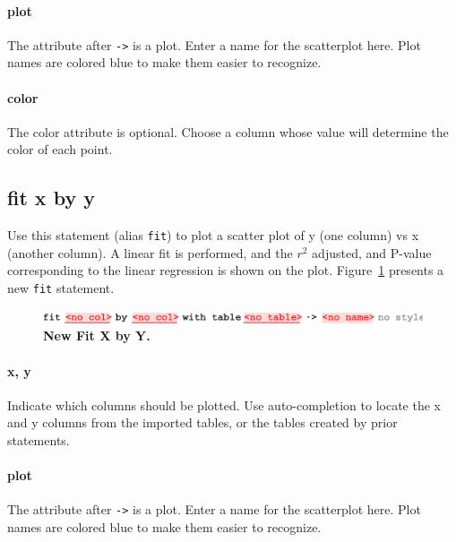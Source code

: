 \paragraph{plot}
The attribute after \texttt{->} is a plot. Enter a name for the scatterplot here. Plot names are colored blue to make them easier to recognize.
\paragraph{color}
The color attribute is optional. Choose a column whose value will determine the color of each point. 

\subsection{fit x by y}
Use this statement (alias \texttt{fit}) to plot a scatter plot of y (one column) vs x (another column). A linear fit is performed, and the $r^{2}$ adjusted, and P-value corresponding to the linear regression is shown on the plot. Figure~\ref{fig:NewFitXByY} presents a new \texttt{fit} statement.

\begin{figure}[h!tbp]
  \centering
  \includegraphics[width=\figWidthWide]{figures/NewFitXByY.pdf}
\caption[New Fit X by Y.]{\textbf{New Fit X by Y.}}
\label{fig:NewFitXByY}
\end{figure}

\paragraph{x, y}
Indicate which columns should be plotted. Use auto-completion to locate the x and y columns from the imported tables, or the tables created by prior statements. 

\paragraph{plot}
The attribute after \texttt{->} is a plot. Enter a name for the scatterplot here. Plot names are colored blue to make them easier to recognize.

